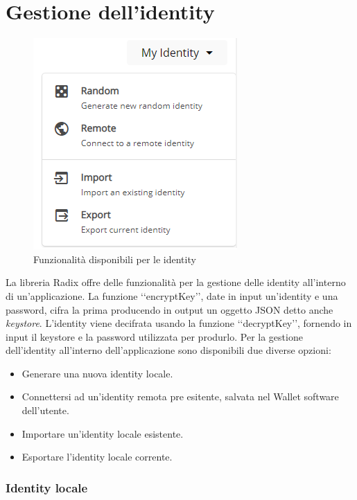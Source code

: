 \section{Gestione dell'identity}

\begin{figure}[H]
    \centering
    \includegraphics{images/application/identity-manage.png}
    \caption{Funzionalità disponibili per le identity}
    \label{fig:identity_manage}
\end{figure}

La libreria Radix offre delle funzionalità per la gestione delle identity all'interno di un'applicazione. La funzione ‘‘encryptKey’’, date in input un'identity e una password, cifra la prima producendo in output un oggetto JSON detto anche \textit{keystore}. L'identity viene decifrata usando la funzione ‘‘decryptKey’’, fornendo in input il keystore e la password utilizzata per produrlo. Per la gestione dell'identity all'interno dell'applicazione sono disponibili due diverse opzioni:
\begin{itemize}
    \item Generare una nuova identity locale.
    \item Connettersi ad un'identity remota pre esitente, salvata nel Wallet software dell'utente.
    \item Importare un'identity locale esistente.
    \item Esportare l'identity locale corrente.
\end{itemize}

\subsubsection{Identity locale}

